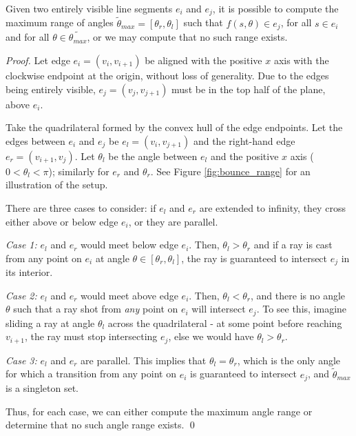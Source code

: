 \documentclass[]{styles/svproc}  %
\begin{document}
\begin{proposition} \label{prop:saferange}
Given two entirely visible line segments $e_i$ and $e_j$, it is possible to compute
the maximum range of angles $\tilde{\theta}_{max} = [\theta_r, \theta_l]$ such
that $f(s, \theta) \in e_j$, for all $s \in e_i$ and for all
$\theta \in \tilde{\theta_{max}}$, or we may compute that no such range exists.
\end{proposition}

\begin{proof}

Let edge $e_i = (v_i, v_{i+1})$ be aligned with the positive $x$ axis with the clockwise
endpoint at the origin, without loss of generality. Due to the edges being
entirely visible, $e_j = (v_j, v_{j+1})$ must be in the top half of the plane, above
$e_i$.

Take the quadrilateral formed by the convex hull of the edge endpoints.
Let the edges between $e_i$ and $e_j$ be $e_l = (v_i, v_{j+1})$ and the right-hand edge 
$e_r = (v_{i+1}, v_j)$. Let $\theta_{l}$ be
the angle between $e_l$ and the positive $x$ axis ($0 < \theta_l < \pi$); similarly
for $e_r$ and $\theta_r$. See Figure \ref{fig:bounce_range} for an illustration of
the setup. 

There are three cases to consider: if $e_l$ and $e_r$ are extended to infinity,
they cross either above or below edge $e_i$, or they are parallel.

\emph{Case 1:} $e_l$ and $e_r$ would meet below edge $e_i$. Then,
$\theta_l > \theta_r$ and if a ray is cast from any point on $e_i$ at angle
$\theta \in [\theta_r, \theta_l]$, the ray is guaranteed to intersect $e_j$ in its
interior.

\emph{Case 2:} $e_l$ and $e_r$ would meet above edge $e_i$. Then, $\theta_l <
\theta_r$, and there is no angle
$\theta$ such that a ray shot from \emph{any} point on $e_i$ will intersect
$e_j$.
To see this, imagine sliding a ray at angle $\theta_l$ across the quadrilateral
- at some point before reaching $v_{i+1}$, the ray must stop intersecting $e_j$,
else we would have $\theta_l > \theta_r$.

\emph{Case 3:} $e_l$ and $e_r$ are parallel. This implies that $\theta_{l} =
\theta_{r}$, which is the only angle for which a transition from any
point on $e_i$ is guaranteed to intersect $e_j$, and $\tilde{\theta}_{max}$ is a
singleton set.

Thus, for each case, we can either compute the maximum angle range or determine
that no such angle range exists.
\qed

\end{proof}
\end{document}
